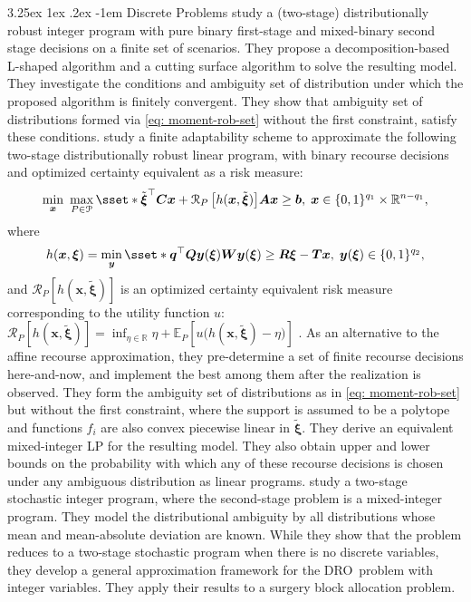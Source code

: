 \documentclass[final,onefignum,onetabnum]{class}
\makeatletter
\renewcommand\paragraph{\@startsection{paragraph}{4}{\z@}%
  {3.25ex \@plus1ex \@minus.2ex}%
  {-1em}%
  {\normalfont\normalsize\bfseries}}
\newcommand{\ee}[2]{\mathbb{E}_{#1} \left[ #2 \right]}
\newcommand{\rrisk}[2]{\Cs{R}_{#1} \left[ #2 \right]}
\newcommand{\bs}[1]{\boldsymbol{#1}} %
\newcommand{\Bs}[1]{\mathbb{#1}} %
\newcommand{\Cs}[1]{\mathcal{#1}} %
\newcommand{\txi}{\tilde{\bs{\xi}}}
\newcommand{\dro}{DRO}
\makeatother
\begin{document}
\paragraph{Discrete Problems}
\citet{bansal2018} study a (two-stage) distributionally robust integer program with pure binary first-stage and mixed-binary second stage decisions on a finite set of scenarios. They propose a  decomposition-based L-shaped algorithm and a cutting surface algorithm to solve the resulting model. They investigate the conditions and ambiguity set of distribution under which the proposed algorithm is finitely convergent. They show that ambiguity set of distributions formed via \eqref{eq: moment-rob-set} without the first constraint,  satisfy these conditions. 
\citet{hanasusanto2016} study a finite adaptability scheme to approximate the following   two-stage distributionally robust linear program, with binary recourse decisions and optimized certainty equivalent as a risk measure:
\begin{equation*}
    \min_{\bs{x}} \ \max_{P \in \Cs{P}}  \sset*{\txi^{\top} \bs{C} \bs{x} + \rrisk{P}{h(\bs{x}, \txi)}}{\bs{A}\bs{x} \ge \bs{b}, \; \bs{x} \in \{0,1\}^{q_{1}} \times \Bs{R}^{n-q_{1}}},
\end{equation*}
where 
\begin{equation*}
    h(\bs{x},\bs{\xi})=\min_{\bs{y}}\sset*{\bs{q}^{\top}\bs{Q}\bs{y}(\bs{\xi})}{\bs{W}\bs{y}(\bs{\xi}) \ge \bs{R}\bs{\xi} - \bs{T} \bs{x}, \; \bs{y}(\bs{\xi}) \in \{0,1\}^{q_{2}} },
\end{equation*}
and 
$\rrisk{P}{h(\bs{x}, \txi)}$ is an optimized certainty equivalent risk measure corresponding to the utility  function $u$:  $\rrisk{P}{h(\bs{x}, \txi)}=\inf_{\eta \in \Bs{R}} \eta + \ee{P}{u\big(h(\bs{x}, \txi)-\eta\big)}$ \citep{bental1986,bental2007OCE}. 
As an alternative to the affine recourse approximation, they pre-determine a set of finite recourse decisions here-and-now, and implement the best among them after the realization is observed. They form the ambiguity set of distributions as in \eqref{eq: moment-rob-set} but without the first constraint, where the support is assumed to be a polytope and functions $f_{i}$ are also convex piecewise linear in $\txi$. They derive an equivalent  mixed-integer LP for the resulting model. They also obtain upper and lower bounds on the probability with which any of these recourse decisions is chosen under any ambiguous distribution  as  linear programs.  
\citet{postek2018sip} study a  two-stage stochastic integer program, where the second-stage problem is a mixed-integer program. They model the distributional ambiguity by all distributions whose mean and mean-absolute deviation are known. While they show that the problem reduces to a two-stage stochastic program when there is no discrete variables, they  develop a general approximation framework for the \dro\ problem with integer variables. They apply their results to  a surgery block allocation problem.
\end{document}
